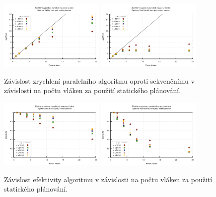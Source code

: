 \begin{figure}
    \centering
    \includegraphics[width=0.45\textwidth]{../grafy/02_openMP/02-02-Dijsktra_zrychleni}
    \includegraphics[width=0.45\textwidth]{../grafy/02_openMP/02-02-Floyd_zrychleni}
    \caption{Závislost zrychlení paralelního algoritmu oproti sekvenčnímu v závislosti na počtu vláken za použití statického plánování.}
    \label{f:mer:zry}
\end{figure}

\begin{figure}
    \centering
    \includegraphics[width=0.45\textwidth]{../grafy/02_openMP/02-03-Dijsktra_efektivita}
    \includegraphics[width=0.45\textwidth]{../grafy/02_openMP/02-03-Floyd_efektivita}
    \caption{Závislost efektivity algoritmu v závislosti na počtu vláken za použití statického plánování.}
    \label{f:mer:efe}
\end{figure}

